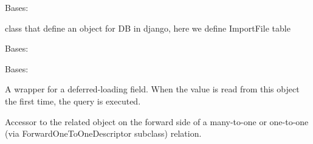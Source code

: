 \documentclass[letterpaper,10pt,english]{sphinxmanual}
\begin{document}
\begin{fulllineitems}
\label{\detokenize{QuChemPedIA.models:QuChemPedIA.models.ImportFileModels.ImportFile}}
Bases: 

class that define an object for DB in django, here we define ImportFile table

\begin{fulllineitems}
\label{\detokenize{QuChemPedIA.models:QuChemPedIA.models.ImportFileModels.ImportFile.DoesNotExist}}
Bases: 

\end{fulllineitems}


\begin{fulllineitems}
\label{\detokenize{QuChemPedIA.models:QuChemPedIA.models.ImportFileModels.ImportFile.MultipleObjectsReturned}}
Bases: 

\end{fulllineitems}


\begin{fulllineitems}
\label{\detokenize{QuChemPedIA.models:QuChemPedIA.models.ImportFileModels.ImportFile.id_file}}
A wrapper for a deferred-loading field. When the value is read from this
object the first time, the query is executed.

\end{fulllineitems}


\begin{fulllineitems}
\label{\detokenize{QuChemPedIA.models:QuChemPedIA.models.ImportFileModels.ImportFile.id_software}}
Accessor to the related object on the forward side of a many-to-one or
one-to-one (via ForwardOneToOneDescriptor subclass) relation.


\end{fulllineitems}
\end{fulllineitems}
\end{document}
